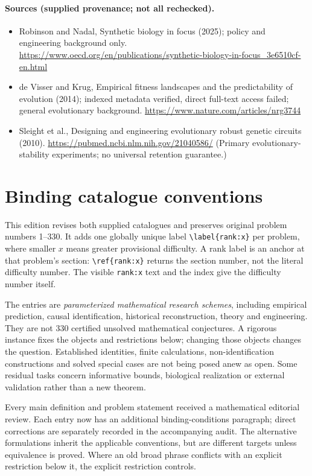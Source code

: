 \documentclass[11pt]{article}
\begin{document}
\paragraph{Sources (supplied provenance; not all rechecked).} \begin{itemize}
\item Robinson and Nadal, Synthetic biology in focus (2025); policy and engineering background only. \url{https://www.oecd.org/en/publications/synthetic-biology-in-focus_3e6510cf-en.html}
\item de Visser and Krug, Empirical fitness landscapes and the predictability of evolution (2014); indexed metadata verified, direct full-text access failed; general evolutionary background. \url{https://www.nature.com/articles/nrg3744}
\item Sleight et al., Designing and engineering evolutionary robust genetic circuits (2010). \url{https://pubmed.ncbi.nlm.nih.gov/21040586/} (Primary evolutionary-stability experiments; no universal retention guarantee.)
\end{itemize}


\section*{Binding catalogue conventions}
This edition revises both supplied catalogues and preserves original problem numbers 1--330. It adds one globally unique label \verb|\label{rank:x}| per problem, where smaller $x$ means greater provisional difficulty. A rank label is an anchor at that problem's section: \verb|\ref{rank:x}| returns the section number, not the literal difficulty number. The visible \texttt{rank:x} text and the index give the difficulty number itself.

The entries are \emph{parameterized mathematical research schemes}, including empirical prediction, causal identification, historical reconstruction, theory and engineering. They are not 330 certified unsolved mathematical conjectures. A rigorous instance fixes the objects and restrictions below; changing those objects changes the question. Established identities, finite calculations, non-identification constructions and solved special cases are not being posed anew as open. Some residual tasks concern informative bounds, biological realization or external validation rather than a new theorem.

Every main definition and problem statement received a mathematical editorial review. Each entry now has an additional binding-conditions paragraph; direct corrections are separately recorded in the accompanying audit. The alternative formulations inherit the applicable conventions, but are different targets unless equivalence is proved. Where an old broad phrase conflicts with an explicit restriction below it, the explicit restriction controls.
\end{document}
